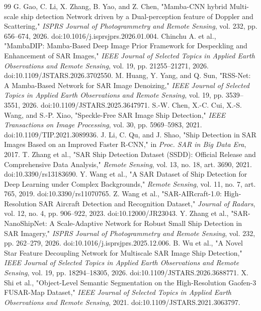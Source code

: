 \documentclass[UTF8,12pt,a4paper]{ctexart}
\begin{document}
{\begin{thebibliography}{99}
G. Gao, C. Li, X. Zhang, B. Yao, and Z. Chen, "Mamba-CNN hybrid Multi-scale ship detection Network driven by a Dual-perception feature of Doppler and Scattering," \emph{ISPRS Journal of Photogrammetry and Remote Sensing}, vol. 232, pp. 656--674, 2026. doi:10.1016/j.isprsjprs.2026.01.004.
Chinchu A. et al., "MambaDIP: Mamba-Based Deep Image Prior Framework for Despeckling and Enhancement of SAR Images," \emph{IEEE Journal of Selected Topics in Applied Earth Observations and Remote Sensing}, vol. 19, pp. 21255--21271, 2026. doi:10.1109/JSTARS.2026.3702550.
M. Huang, Y. Yang, and Q. Sun, "RSS-Net: A Mamba-Based Network for SAR Image Denoizing," \emph{IEEE Journal of Selected Topics in Applied Earth Observations and Remote Sensing}, vol. 19, pp. 3539--3551, 2026. doi:10.1109/JSTARS.2025.3647971.
S.-W. Chen, X.-C. Cui, X.-S. Wang, and S.-P. Xiao, "Speckle-Free SAR Image Ship Detection," \emph{IEEE Transactions on Image Processing}, vol. 30, pp. 5969--5983, 2021. doi:10.1109/TIP.2021.3089936.
J. Li, C. Qu, and J. Shao, "Ship Detection in SAR Images Based on an Improved Faster R-CNN," in \emph{Proc. SAR in Big Data Era}, 2017.
T. Zhang et al., "SAR Ship Detection Dataset (SSDD): Official Release and Comprehensive Data Analysis," \emph{Remote Sensing}, vol. 13, no. 18, art. 3690, 2021. doi:10.3390/rs13183690.
Y. Wang et al., "A SAR Dataset of Ship Detection for Deep Learning under Complex Backgrounds," \emph{Remote Sensing}, vol. 11, no. 7, art. 765, 2019. doi:10.3390/rs11070765.
Z. Wang et al., "SAR-AIRcraft-1.0: High-Resolution SAR Aircraft Detection and Recognition Dataset," \emph{Journal of Radars}, vol. 12, no. 4, pp. 906--922, 2023. doi:10.12000/JR23043.
Y. Zhang et al., "SAR-NanoShipNet: A Scale-Adaptive Network for Robust Small Ship Detection in SAR Imagery," \emph{ISPRS Journal of Photogrammetry and Remote Sensing}, vol. 232, pp. 262--279, 2026. doi:10.1016/j.isprsjprs.2025.12.006.
B. Wu et al., "A Novel Star Feature Decoupling Network for Multiscale SAR Image Ship Detection," \emph{IEEE Journal of Selected Topics in Applied Earth Observations and Remote Sensing}, vol. 19, pp. 18294--18305, 2026. doi:10.1109/JSTARS.2026.3688771.
X. Shi et al., "Object-Level Semantic Segmentation on the High-Resolution Gaofen-3 FUSAR-Map Dataset," \emph{IEEE Journal of Selected Topics in Applied Earth Observations and Remote Sensing}, 2021. doi:10.1109/JSTARS.2021.3063797.
\end{thebibliography}
}
\end{document}
